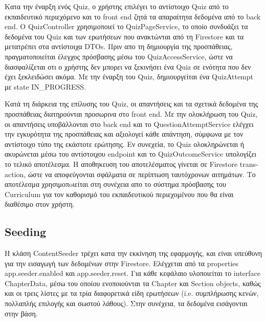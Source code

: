 \documentclass{article}
\begin{document}
Κατα την έναρξη ενός \foreignlanguage{english}{Quiz}, ο χρήστης επιλέγει το αντίστοιχο \foreignlanguage{english}{Quiz} από το εκπαιδευτικό περιεχόμενο και το \foreignlanguage{english}{front end} ζητά τα απαραίτητα δεδομένα από το \foreignlanguage{english}{back end}. O \foreignlanguage{english}{QuizController} χρησιμοποιεί το \foreignlanguage{english}{QuizPageService}, το οποίο συνδυάζει τα δεδομένα του \foreignlanguage{english}{Quiz} και των ερωτήσεων που ανακτώνται από τη \foreignlanguage{english}{Firestore} και τα μετατρέπει στα αντίστοιχα \foreignlanguage{english}{DTOs}. Πριν απο τη δημιουργία της προσπάθειας, πραγματοποιείται έλεγχος πρόσβασης μέσω του \foreignlanguage{english}{QuizAccessService}, ώστε να διασφαλίζεται οτι ο χρήστης δεν μπορει να ξεκινήσει ένα \foreignlanguage{english}{Quiz} σε ενότητα που δεν έχει ξεκλειδώσει ακόμα. Με την έναρξη του \foreignlanguage{english}{Quiz}, δημιουργείται ένα \foreignlanguage{english}{QuizAttempt} με \foreignlanguage{english}{state IN\_PROGRESS}.

Κατά τη διάρκεια της επίλυσης του \foreignlanguage{english}{Quiz}, οι απαντήσεις και τα σχετικά δεδομένα της προσπάθειας διατηρούνται προσωρινα στο \foreignlanguage{english}{front end}. Με την ολοκλήρωση του \foreignlanguage{english}{Quiz}, οι απαντήσεις υποβάλλονται στο \foreignlanguage{english}{back end} και το \foreignlanguage{english}{QuestionAttemptService} ελέγχει την εγκυρότητα της προσπάθειας και αξιολογεί κάθε απάντηση, σύμφωνα με τον αντίστοιχο τύπο της εκάστοτε ερώτησης. Εν συνεχεία, το \foreignlanguage{english}{Quiz} ολοκληρώνεται ή ακυρώνεται μέσω του αντίστοιχου \foreignlanguage{english}{endpoint} και το \foreignlanguage{english}{QuizOutcomeService} υπολογίζει το τελικό αποτέλεσμα. Η αποθηκευση του αποτελέσματος γίνεται σε \foreignlanguage{english}{Firestore transaction}, ώστε να αποφεύγονται σφάλματα σε περίπτωση ταυτόχρονων αιτημάτων. Το αποτέλεσμα χρησιμοπoιείται στη συνέχεια απο το σύστημα πρόσβασης του \foreignlanguage{english}{Curriculum} για τον καθορισμό του εκπαιδευτικού περιεχομένου που θα είναι διαθέσιμο στον χρήστη.

\subsection{\foreignlanguage{english}{Seeding}}
H κλάση \foreignlanguage{english}{ContentSeeder} τρέχει κατα την εκκίνηση της εφαρμογής, και είναι υπεύθυνη για την εισαγωγή των δεδομένων στην \foreignlanguage{english}{Firestore}. Ελέγχεται από τα \foreignlanguage{english}{properties app.seeder.enabled} και \foreignlanguage{english}{app.seeder.reset}. Για κάθε κεφάλαιο υλοποιείται το \foreignlanguage{english}{interface ChapterData},  μέσω του οποίου ενοποιούνται τα \foreignlanguage{english}{Chapter} και \foreignlanguage{english}{Section objects}, καθώς και οι τρεις λίστες με τα τρία διαφορετικά είδη ερωτήσεων (\foreignlanguage{english}{i.e}. συμπλήρωσης κενών, πολλαπλής επιλογής και σωστού λάθους). Στην συνέχεια, τα δεδομένα εισάγονται στην βάση.
\end{document}
